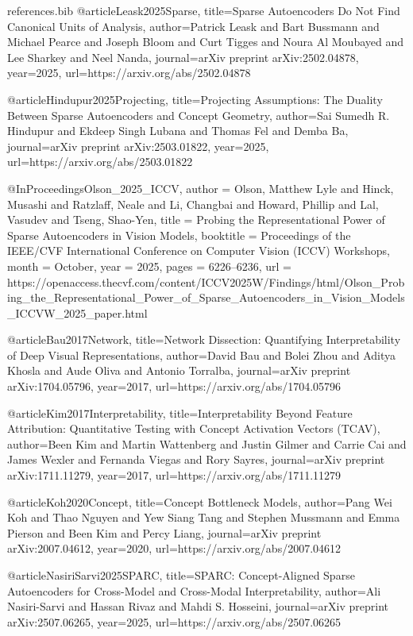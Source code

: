 \begin{filecontents*}{references.bib}
@article{Leask2025Sparse,
  title={Sparse Autoencoders Do Not Find Canonical Units of Analysis},
  author={Patrick Leask and Bart Bussmann and Michael Pearce and Joseph Bloom and Curt Tigges and Noura Al Moubayed and Lee Sharkey and Neel Nanda},
  journal={arXiv preprint arXiv:2502.04878},
  year={2025},
  url={https://arxiv.org/abs/2502.04878}
}

@article{Hindupur2025Projecting,
  title={Projecting Assumptions: The Duality Between Sparse Autoencoders and Concept Geometry},
  author={Sai Sumedh R. Hindupur and Ekdeep Singh Lubana and Thomas Fel and Demba Ba},
  journal={arXiv preprint arXiv:2503.01822},
  year={2025},
  url={https://arxiv.org/abs/2503.01822}
}

@InProceedings{Olson_2025_ICCV,
  author    = {Olson, Matthew Lyle and Hinck, Musashi and Ratzlaff, Neale and Li, Changbai and Howard, Phillip and Lal, Vasudev and Tseng, Shao-Yen},
  title     = {Probing the Representational Power of Sparse Autoencoders in Vision Models},
  booktitle = {Proceedings of the IEEE/CVF International Conference on Computer Vision (ICCV) Workshops},
  month     = {October},
  year      = {2025},
  pages     = {6226--6236},
  url       = {https://openaccess.thecvf.com/content/ICCV2025W/Findings/html/Olson_Probing_the_Representational_Power_of_Sparse_Autoencoders_in_Vision_Models_ICCVW_2025_paper.html}
}

@article{Bau2017Network,
  title={Network Dissection: Quantifying Interpretability of Deep Visual Representations},
  author={David Bau and Bolei Zhou and Aditya Khosla and Aude Oliva and Antonio Torralba},
  journal={arXiv preprint arXiv:1704.05796},
  year={2017},
  url={https://arxiv.org/abs/1704.05796}
}

@article{Kim2017Interpretability,
  title={Interpretability Beyond Feature Attribution: Quantitative Testing with Concept Activation Vectors (TCAV)},
  author={Been Kim and Martin Wattenberg and Justin Gilmer and Carrie Cai and James Wexler and Fernanda Viegas and Rory Sayres},
  journal={arXiv preprint arXiv:1711.11279},
  year={2017},
  url={https://arxiv.org/abs/1711.11279}
}

@article{Koh2020Concept,
  title={Concept Bottleneck Models},
  author={Pang Wei Koh and Thao Nguyen and Yew Siang Tang and Stephen Mussmann and Emma Pierson and Been Kim and Percy Liang},
  journal={arXiv preprint arXiv:2007.04612},
  year={2020},
  url={https://arxiv.org/abs/2007.04612}
}

@article{NasiriSarvi2025SPARC,
  title={SPARC: Concept-Aligned Sparse Autoencoders for Cross-Model and Cross-Modal Interpretability},
  author={Ali Nasiri-Sarvi and Hassan Rivaz and Mahdi S. Hosseini},
  journal={arXiv preprint arXiv:2507.06265},
  year={2025},
  url={https://arxiv.org/abs/2507.06265}
}
\end{filecontents*}

